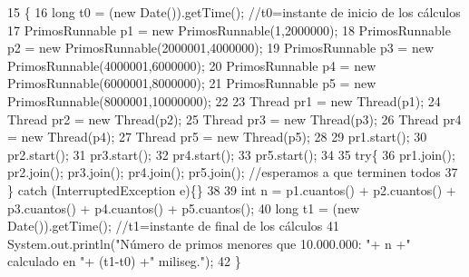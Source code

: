 \begin{DoxyCode}
15                                        \{
16            \textcolor{keywordtype}{long} t0 = (\textcolor{keyword}{new} Date()).getTime(); \textcolor{comment}{//t0=instante de inicio de los cálculos}
17            PrimosRunnable p1 = \textcolor{keyword}{new} PrimosRunnable(1,2000000);
18            PrimosRunnable p2 = \textcolor{keyword}{new} PrimosRunnable(2000001,4000000);
19            PrimosRunnable p3 = \textcolor{keyword}{new} PrimosRunnable(4000001,6000000);
20            PrimosRunnable p4 = \textcolor{keyword}{new} PrimosRunnable(6000001,8000000);
21            PrimosRunnable p5 = \textcolor{keyword}{new} PrimosRunnable(8000001,10000000);
22            
23            Thread pr1 = \textcolor{keyword}{new} Thread(p1);
24            Thread pr2 = \textcolor{keyword}{new} Thread(p2);
25            Thread pr3 = \textcolor{keyword}{new} Thread(p3);
26            Thread pr4 = \textcolor{keyword}{new} Thread(p4);
27            Thread pr5 = \textcolor{keyword}{new} Thread(p5);
28            
29            pr1.start();
30            pr2.start();
31            pr3.start();
32            pr4.start();
33            pr5.start();
34            
35            \textcolor{keywordflow}{try}\{
36             pr1.join(); pr2.join(); pr3.join(); pr4.join(); pr5.join(); \textcolor{comment}{//esperamos a que terminen todos}
37            \} \textcolor{keywordflow}{catch} (InterruptedException e)\{\}
38            
39            \textcolor{keywordtype}{int} n = p1.cuantos() + p2.cuantos() + p3.cuantos() + p4.cuantos() + p5.cuantos();
40            \textcolor{keywordtype}{long} t1 = (\textcolor{keyword}{new} Date()).getTime(); \textcolor{comment}{//t1=instante de final de los cálculos}
41            System.out.println(\textcolor{stringliteral}{"Número de primos menores que 10.000.000: "}+ n +\textcolor{stringliteral}{" calculado en "}+ (t1-t0) +\textcolor{stringliteral}{"
       miliseg."});
42     \}
\end{DoxyCode}
